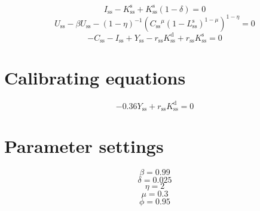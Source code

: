 \begin{equation}
I_\mathrm{ss} - K^{\mathrm{s}}_\mathrm{ss} + {K^{\mathrm{s}}_\mathrm{ss}} \left(1 - \delta\right) = 0
\end{equation}
\begin{equation}
U_\mathrm{ss} - {\beta} {U_\mathrm{ss}} - \left(1 - \eta\right)^{-1} {\left({{C_\mathrm{ss}}^{\mu}} {\left(1 - L^{\mathrm{s}}_\mathrm{ss}\right)^{1 - \mu}}\right)^{1 - \eta}} = 0
\end{equation}
\begin{equation}
-C_\mathrm{ss} - I_\mathrm{ss} + Y_\mathrm{ss} - {r_\mathrm{ss}} {K^{\mathrm{d}}_\mathrm{ss}} + {r_\mathrm{ss}} {K^{\mathrm{s}}_\mathrm{ss}} = 0
\end{equation}



\section{Calibrating equations}

\begin{equation}
-0.36Y_\mathrm{ss} + {r_\mathrm{ss}} {K^{\mathrm{d}}_\mathrm{ss}} = 0
\end{equation}



\section{Parameter settings}

\begin{equation}
\beta = 0.99
\end{equation}
\begin{equation}
\delta = 0.025
\end{equation}
\begin{equation}
\eta = 2
\end{equation}
\begin{equation}
\mu = 0.3
\end{equation}
\begin{equation}
\phi = 0.95
\end{equation}


